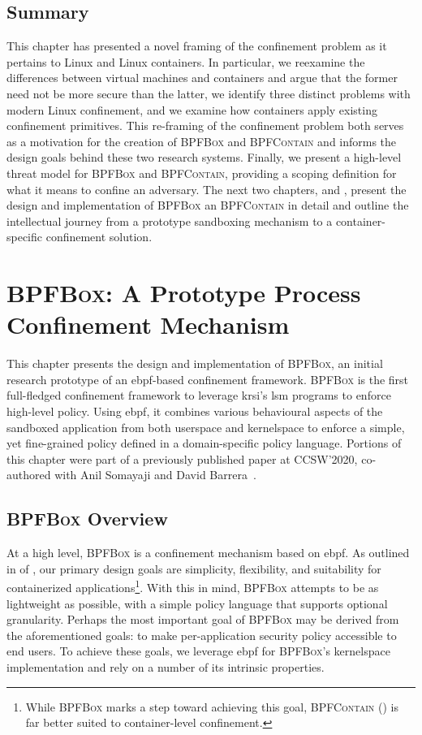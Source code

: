 \documentclass[
  fontsize=12pt,
  titlepage=firstiscover,
  paper=letter,
oneside,
  cleardoublepage=plain,
  parskip=half-,
  DIV=10,
  parindent,
  appendixprefix,
  chapterprefix,
  listof=totoc,
]{scrbook}
\newcommand{\bpfbox}{\textsc{BPFBox}}
\newcommand{\bpfcontain}{\textsc{BPFContain}}
\begin{document}
\section{Summary}

This chapter has presented a novel framing of the confinement problem as it pertains to
Linux and Linux containers. In particular, we reexamine the differences between virtual
machines and containers and argue that the former need not be more secure than the latter,
we identify three distinct problems with modern Linux confinement, and we examine how
containers apply existing confinement primitives. This re-framing of the confinement
problem both serves as a motivation for the creation of \bpfbox{} and \bpfcontain{} and
informs the design goals behind these two research systems. Finally, we present
a high-level threat model for \bpfbox{} and \bpfcontain{}, providing a scoping definition
for what it means to confine an adversary. The next two chapters,  and
, present the design and implementation of \bpfbox{} an \bpfcontain{}
in detail and outline the intellectual journey from a prototype sandboxing mechanism to
a container-specific confinement solution.

\chapter{\bpfbox: A Prototype Process Confinement Mechanism}\label{c:bpfbox}
This chapter presents the design and implementation of \bpfbox{}, an initial research
prototype of an \gls{ebpf}-based confinement framework. \bpfbox{} is the first
full-fledged confinement framework to leverage \gls{krsi}'s \gls{lsm} programs to enforce
high-level policy. Using \gls{ebpf}, it combines various behavioural aspects of the
sandboxed application from both userspace and kernelspace to enforce a simple, yet
fine-grained policy defined in a domain-specific policy language. Portions of this chapter
were part of a previously published paper at CCSW'2020, co-authored with Anil Somayaji and
David Barrera~\cite{findlay2020_bpfbox}.



\section{\bpfbox{} Overview}

At a high level, \bpfbox{} is a confinement mechanism based on \gls{ebpf}. As outlined in
 of , our primary design goals are
simplicity, flexibility, and suitability for containerized applications\footnote{While
\bpfbox{} marks a step toward achieving this goal, \bpfcontain{} () is far
better suited to container-level confinement.}. With this in mind, \bpfbox{} attempts to
be as lightweight as possible, with a simple policy language that supports optional
granularity. Perhaps the most important goal of \bpfbox{} may be derived from the
aforementioned goals: to make per-application security policy accessible to end users. To
achieve these goals, we leverage \gls{ebpf} for \bpfbox{}'s kernelspace implementation and
rely on a number of its intrinsic properties.
\end{document}
